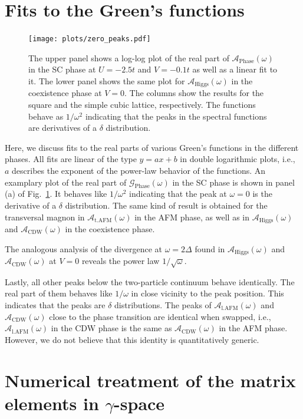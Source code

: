\documentclass[
    reprint, 
    aps,
    preprintnumbers,
    twocolumn,
    prb,
    superscriptaddress
]{revtex4-2}
\newcommand{\greens}[1]{\mathcal{G}_\text{#1} (\omega)}
\newcommand{\spectral}[1]{\mathcal{A}_\text{#1}  (\omega)}
\begin{document}
\section{Fits to the Green's functions}
\label{sec:fit_greens_functions}

\begin{figure}[htb]
    \centering
    \texttt{[image: plots/zero\_peaks.pdf]}
    \caption{The upper panel shows a log-log plot of the real part of $\spectral{Phase}$ 
		in the SC phase at $U=-2.5t$ and $V=-0.1t$ as well as a linear fit to it.
    The lower panel shows the same plot for $\spectral{Higgs}$ in the coexistence phase at $V=0$. 
		The columns show the results for the square and the simple cubic lattice, respectively.
    The functions behave as $1/\omega^2$ indicating that the peaks in the spectral functions are derivatives 
		of a $\delta$ distribution.}
    \label{fig:zero_peaks}
\end{figure}

Here, we discuss fits to the real parts of various Green's functions in the different phases.
All fits are linear of the type $y = ax + b$ in double logarithmic plots, i.e., $a$ describes the exponent of
the power-law behavior of the functions.
An examplary plot of the real part of $\greens{Phase}$ 
in the SC phase is shown in panel (a) of Fig.\ \ref{fig:zero_peaks}.
It behaves like $1/\omega^2$ indicating that the peak 
at $\omega=0$ is the derivative of a $\delta$ distribution.
The same kind of result is obtained for the transversal magnon in $\spectral{t.AFM}$ in the AFM phase, 
as well as in $\spectral{Higgs}$ and $\spectral{CDW}$ in the coexistence phase.

The analogous analysis of the divergence at $\omega = 2\Delta$ 
found in $\spectral{Higgs}$ and $\spectral{CDW}$ at $V=0$
reveals the power law  $1/\sqrt{\omega}$.

Lastly, all other peaks below the two-particle continuum behave identically.
The real part of them behaves like $1/\omega$ in close vicinity to the peak position.
This indicates that the peaks are $\delta$ distributions.
The peaks of $\spectral{l.AFM}$ and $\spectral{CDW}$ close to the phase transition are identical 
when swapped, i.e., $\spectral{l.AFM}$ in the CDW phase is the same as $\spectral{CDW}$ in the AFM phase.
However, we do not believe that this identity is quantitatively generic.

\section{Numerical treatment of the matrix elements in $\gamma$-space}
\label{sec:numerical_ieom}
\end{document}
